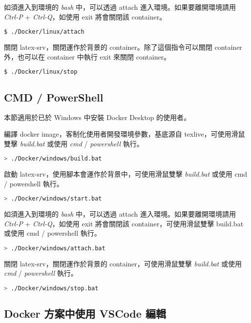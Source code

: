 如須進入到環境的 \emph{bash} 中，可以透過 attach 進入環境。如果要離開環境請用 \emph{Ctrl-P} + \emph{Ctrl-Q}，如使用 exit 將會關閉該 container。
\begin{lstlisting}[language=bash] 
        $ ./Docker/linux/attach
\end{lstlisting}

關閉 latex-srv，關閉運作於背景的 container。除了這個指令可以關閉 container 外，也可以在 container 中執行 exit 來關閉 container。
\begin{lstlisting}[language=bash]
        $ ./Docker/linux/stop
\end{lstlisting}

\newpage

\subsection{CMD / PowerShell}

本節適用於已於 Windows 中安裝 Docker Desktop 的使用者。

編譯 docker image，客制化使用者開發環境參數，基底源自 texlive\cite{docker_texlive}，可使用滑鼠雙擊 \emph{build.bat} 或使用 \emph{cmd} / \emph{powershell} 執行。
\begin{lstlisting}[language=bash]
        > ./Docker/windows/build.bat
\end{lstlisting}

啟動 latex-srv，使用腳本會運作於背景中，可使用滑鼠雙擊 \emph{build.bat} 或使用 cmd / powershell 執行。
\begin{lstlisting}[language=bash]
        > ./Docker/windows/start.bat
\end{lstlisting}

如須進入到環境的 \emph{bash} 中，可以透過 attach 進入環境。如果要離開環境請用 \emph{Ctrl-P} + \emph{Ctrl-Q}，如使用 exit 將會關閉該 container，可使用滑鼠雙擊 build.bat 或使用 cmd / powershell 執行。
\begin{lstlisting}[language=bash]
        > ./Docker/windows/attach.bat
\end{lstlisting}

關閉 latex-srv，關閉運作於背景的 container，可使用滑鼠雙擊 \emph{build.bat} 或使用 \emph{cmd} / \emph{powershell} 執行。
\begin{lstlisting}[language=bash]
        > ./Docker/windows/stop.bat
\end{lstlisting}

\newpage

\subsection{Docker 方案中使用 VSCode 編輯}


